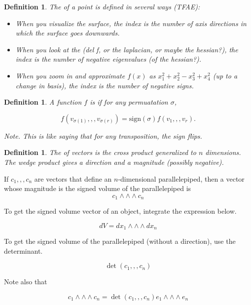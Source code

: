 \documentclass[11pt]{amsbook}
\newenvironment{dateenv}{
	\vspace{1em}
}{
	\vspace{1em}
}
\newcommand{\mydate}[4]{
	\newdate{#1}{#2}{#3}{#4}
	\begin{dateenv}
		\hfill\displaydate{#1}
	\end{dateenv}
}
\theoremstyle{mystyle} %
\newtheorem{defi}[thm]{Definition}
\numberwithin{thm}{section}
\newcommand{\sign}{\text{sign}}
\begin{document}
\begin{defi}
	The  of a point is defined in several ways (TFAE):
	\begin{itemize}
		\item When you visualize the surface, the index is the number of axis directions in which the surface goes downwards.
		\item When you look at the (del f, or the laplacian, or maybe the hessian?), the index is the number of negative eigenvalues (of the hessian?).
		\item When you zoom in and approximate $f(x)$ as $x_1^2 + x_2^2 - x_3^2 + x_4^2$ (up to a change in basis), the index is the number of negative signs.
	\end{itemize}
\end{defi}

\mydate{d20}{5}{12}{2016}

\begin{defi}
	A function $f$ is  if for any permuatation $\sigma$,

	$$f(v_{\sigma(1)},,,v_{\sigma(r)}) = \sign(\sigma)f(v_1,,,v_r).$$

	Note.  This is like saying that for any transposition, the sign flips.
\end{defi}

\begin{defi}
	The  of vectors is the cross product generalized to $n$ dimensions.  The wedge product gives a direction and a magnitude (possibly negative).
\end{defi}
\begin{example}
	If $c_1,,,c_n$ are vectors that define an $n$-dimensional parallelepiped, then a vector whose magnitude is the signed volume of the parallelepiped is $$c_1 \wedge\wedge\wedge c_n$$
\end{example}
\begin{example}
	To get the signed volume vector of an object, integrate the expression below.

	$$ dV = dx_1 \wedge\wedge\wedge dx_n$$
\end{example}
\begin{example}
	To get the signed volume of the parallelepiped (without a direction), use the determinant.

	$$\det(c_1,,,c_n)$$

	Note also that

	$$c_1 \wedge\wedge\wedge c_n = \det(c_1,,,c_n) e_1 \wedge\wedge\wedge e_n$$
\end{example}
\end{document}
